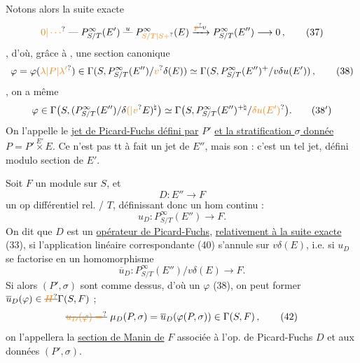  Notons alors la suite exacte 
\[
 \unsure{0|\cdots}\mathrel{\text{---}}P^\infty_{S/T}(E')\mathrel{\overset{u}{\text{---}}}P^\infty_{\unsure{S/T|S+}}(E)\xrightarrow{\deleted{\unsure{p}}v}P^\infty_{S/T}(E'')\longrightarrow 0 \,, \tag*{(37)}
\]
, d'où, grâce à  , une section canonique
\[
 \varphi=\varphi(\unsure{\lambda|P|\lambda'})\in\Gamma(S,P^\infty_{S/T}(E'')/\unsure{v}\delta(E))\simeq
 \Gamma(S,P^\infty_{S/T}(E'')^+/v\delta u(E')) \,, \tag*{(38)}
\]
 ,  on a  même
\[
 \varphi\in\Gamma\bigl(S,(P^\infty_{S/T}(E'')/\delta\unsure{(|v}E)^\natural\bigr)\simeq
 \Gamma\bigl(S,P^\infty_{S/T}(E'')^{+\natural}/\unsure{\delta u(E')}\bigr). \tag*{(38$'$)}
\]
On l'appelle le  \uline{jet de Picard-Fuchs défini par} $P'$  \uline{et la stratification $\sigma$ donnée}  $P=P'\mathbin{\overset{E'}{\times}}E$. Ce n'est pas tt à fait un jet  de $E''$, mais son   : c'est  un tel jet, défini modulo   section de  $E'$.

Soit $F$ un module  sur  $S$, et
\[
 D:E''\longrightarrow F \tag*{(39)}
\]
un op différentiel  rel. / $T$, définissant donc un hom  continu : 
\[
 u_D:P^\infty_{S/T}(E'')\longrightarrow F . \tag*{(40)}
\]
On dit que  $D$ est un \uline{opérateur de Picard-Fuchs}, \uline{relativement à la suite exacte} (33), si l'application linéaire correspondante (40) s'annule sur $v\delta(E)$, i.e. si $u_D$ se factorise en un homomorphisme
\[
 \overline u_D:P^\infty_{S/T}(E'')/v\delta(E)\longrightarrow F . \tag*{(41)}
\]
 Si alors $(P',\sigma)$ sont comme dessus, d'où un $\varphi$ (38), on peut former $\overline u_D(\varphi)\in\deleted{\unsure{H}}\Gamma(S,F)$ ; 
\[
 \deleted{\unsure{u_D(\varphi)=}}\ \mu_D(P,\sigma)=\overline u_D(\varphi(P,\sigma))\in\Gamma(S,F)\,, \tag*{(42)}
\]
on l'appellera la \uline{section de Manin de} $F$ associée à l'op. de Picard-Fuchs $D$ et aux données $(P',\sigma)$.

